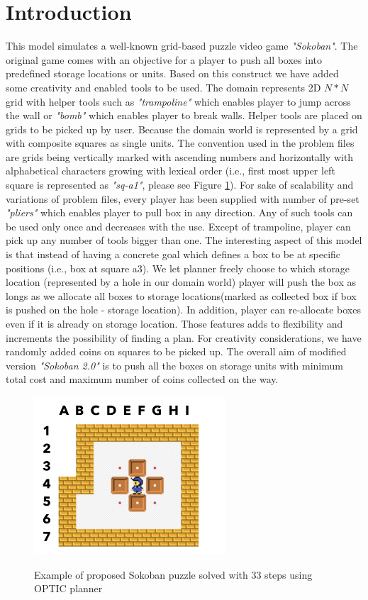 \documentclass[letterpaper]{article} %
\begin{document}
\section{Introduction}
This model simulates a well-known grid-based puzzle video game \emph{"Sokoban"}. The original game comes with an objective for a player to push all boxes into predefined storage locations or units. Based on this construct we have added some creativity and enabled tools to be used. The domain represents 2D \(N*N\) grid with helper tools such as \emph{"trampoline"} which enables player to jump across the wall or \emph{"bomb"} which enables player to break walls. Helper tools are placed on grids to be picked up by user. Because the domain world is represented by a grid with composite squares as single units. The convention used in the problem files are grids being vertically marked with ascending numbers and horizontally with alphabetical characters growing with lexical order (i.e., first most upper left square is represented as \emph{"sq-a1"}, please see Figure \ref{fig:example}). For sake of scalability and variations of problem files, every player has been supplied with number of pre-set \emph{"pliers"} which enables player to pull box in any direction. Any of such tools can be used only once and decreases with the use. Except of trampoline, player can pick up any number of tools bigger than one. The interesting aspect of this model is that instead of having a concrete goal which defines a box to be at specific positions (i.e., box at square a3). We let planner freely choose to which storage location (represented by a hole in our domain world) player will push the box as longs as we allocate all boxes to storage locations(marked as collected box if box is pushed on the hole - storage location). In addition, player can re-allocate boxes even if it is already on storage location. Those features adds to flexibility and increments the possibility of finding a plan. For creativity considerations, we have randomly added coins on squares to be picked up. The overall aim of modified version \emph{"Sokoban 2.0"} is to push all the boxes on storage units with minimum total cost and maximum number of coins collected on the way.  
\begin{figure}
    \includegraphics[width=2.8in]{figure1.JPG} \\
    \caption{Example of proposed Sokoban puzzle solved with 33 steps using OPTIC planner}\label{fig:example}
\end{figure}
\end{document}
